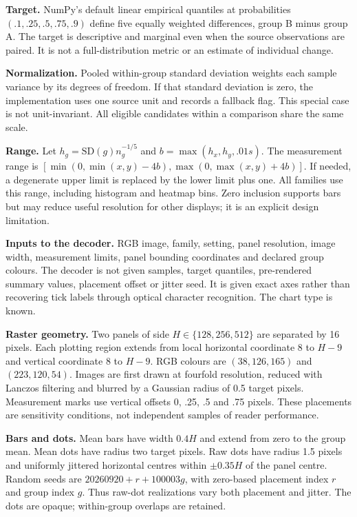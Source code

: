 \documentclass[10pt]{article}
\begin{document}
\textbf{Target.} NumPy's default linear empirical quantiles at probabilities $(.1,.25,.5,.75,.9)$ define five equally weighted differences, group B minus group A. The target is descriptive and marginal even when the source observations are paired. It is not a full-distribution metric or an estimate of individual change.

\textbf{Normalization.} Pooled within-group standard deviation weights each sample variance by its degrees of freedom. If that standard deviation is zero, the implementation uses one source unit and records a fallback flag. This special case is not unit-invariant. All eligible candidates within a comparison share the same scale.

\textbf{Range.} Let $h_g=\mathrm{SD}(g)n_g^{-1/5}$ and $b=\max(h_x,h_y,.01s)$. The measurement range is $[\min(0,\min(x,y)-4b),\max(0,\max(x,y)+4b)]$. If needed, a degenerate upper limit is replaced by the lower limit plus one. All families use this range, including histogram and heatmap bins. Zero inclusion supports bars but may reduce useful resolution for other displays; it is an explicit design limitation.

\textbf{Inputs to the decoder.} RGB image, family, setting, panel resolution, image width, measurement limits, panel bounding coordinates and declared group colours. The decoder is not given samples, target quantiles, pre-rendered summary values, placement offset or jitter seed. It is given exact axes rather than recovering tick labels through optical character recognition. The chart type is known.

\textbf{Raster geometry.} Two panels of side $H\in\{128,256,512\}$ are separated by 16 pixels. Each plotting region extends from local horizontal coordinate 8 to $H-9$ and vertical coordinate 8 to $H-9$. RGB colours are $(38,126,165)$ and $(223,120,54)$. Images are first drawn at fourfold resolution, reduced with Lanczos filtering and blurred by a Gaussian radius of 0.5 target pixels. Measurement marks use vertical offsets 0, .25, .5 and .75 pixels. These placements are sensitivity conditions, not independent samples of reader performance.

\textbf{Bars and dots.} Mean bars have width $0.4H$ and extend from zero to the group mean. Mean dots have radius two target pixels. Raw dots have radius 1.5 pixels and uniformly jittered horizontal centres within $\pm0.35H$ of the panel centre. Random seeds are $20260920+r+100003g$, with zero-based placement index $r$ and group index $g$. Thus raw-dot realizations vary both placement and jitter. The dots are opaque; within-group overlaps are retained.
\end{document}
